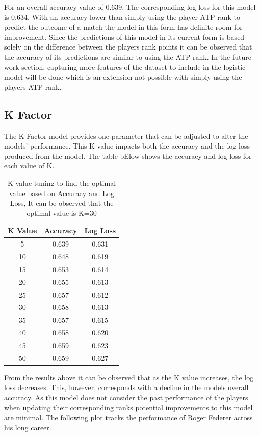 \documentclass[12pt,a4paper]{article}
\begin{document}
For an overall accuracy value of 0.639. The corresponding log loss for this model is 0.634.
With an accuracy lower than simply using the player ATP rank to predict the outcome of a
match the model in this form has definite room for improvement. Since the predictions of
this model in its current form is based solely on the difference between the players rank
points it can be observed that the accuracy of its predictions are similar to using the ATP
rank. In the future work section, capturing more features of the dataset to include in the
logistic model will be done which is an extension not possible with simply using the players
ATP rank.
\subsection{K Factor}
The K Factor model provides one parameter that can be adjusted to alter the models' performance.
This K value impacts both the accuracy and the log loss produced from the model. The table
bElow shows the accuracy and log loss for each value of K.

\begin{table}[h]
  \centering
  \begin{tabular}{||c c c||}
    \hline
    K Value & Accuracy & Log Loss \\
    \hline\hline
    5       & 0.639    & 0.631    \\
    10      & 0.648    & 0.619    \\
    15      & 0.653    & 0.614    \\
    20      & 0.655    & 0.613    \\
    25      & 0.657    & 0.612    \\
    30      & 0.658    & 0.613    \\
    35      & 0.657    & 0.615    \\
    40      & 0.658    & 0.620    \\
    45      & 0.659    & 0.623    \\
    50      & 0.659    & 0.627    \\
    \hline
  \end{tabular}
  \caption{K value tuning to find the optimal value based on Accuracy and Log Loss, It
    can be observed that the optimal value is K=30}
\end{table}
From the results above it can be observed that as the K value increases, the log loss decreases.
This, however, corresponds with a decline in the models overall accuracy. As this model
does not consider the past performance of the players when updating their corresponding
ranks potential improvements to this model are minimal. The following plot tracks the performance
of Roger Federer across his long career.
\end{document}
